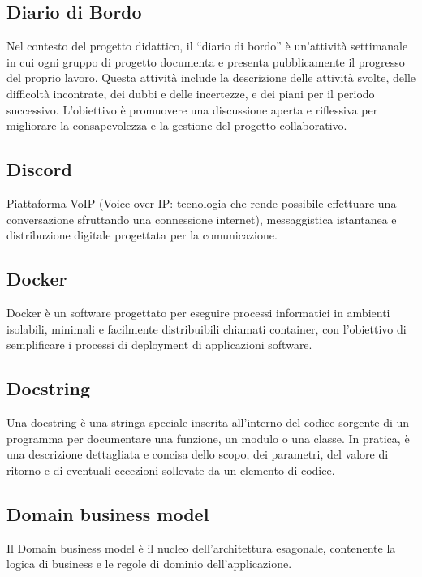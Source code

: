 \hypertarget{sec:diario_di_bordo}{}
\subsection*{Diario di Bordo}
Nel contesto del progetto didattico, il “diario di bordo” è un’attività settimanale in cui ogni gruppo di progetto documenta e presenta pubblicamente il progresso del proprio lavoro. 
Questa attività include la descrizione delle attività svolte, delle difficoltà incontrate, dei dubbi e delle incertezze, e dei piani per il periodo successivo. 
L’obiettivo è promuovere una discussione aperta e riflessiva per migliorare la consapevolezza e la gestione del progetto collaborativo.

\subsection*{Discord}
Piattaforma VoIP (Voice over IP: tecnologia che rende possibile effettuare una conversazione sfruttando una connessione internet), messaggistica istantanea 
e distribuzione digitale progettata per la comunicazione.

\hypertarget{sec:docker}{}
\subsection*{Docker}
Docker è un software progettato per eseguire processi informatici in ambienti isolabili, minimali e facilmente distribuibili chiamati 
container, con l’obiettivo di semplificare i processi di deployment di applicazioni software.

\hypertarget{sec:docstring}{}
\subsection*{Docstring}
Una docstring è una stringa speciale inserita all'interno del codice sorgente di un programma per documentare una funzione, un modulo 
o una classe. In pratica, è una descrizione dettagliata e concisa dello scopo, dei parametri, del valore di ritorno e di eventuali 
eccezioni sollevate da un elemento di codice.

\hypertarget{sec: domain business model}{}
\subsection*{Domain business model}
Il Domain business model è il nucleo dell'architettura esagonale, contenente la logica di business e le regole di dominio dell'applicazione.


